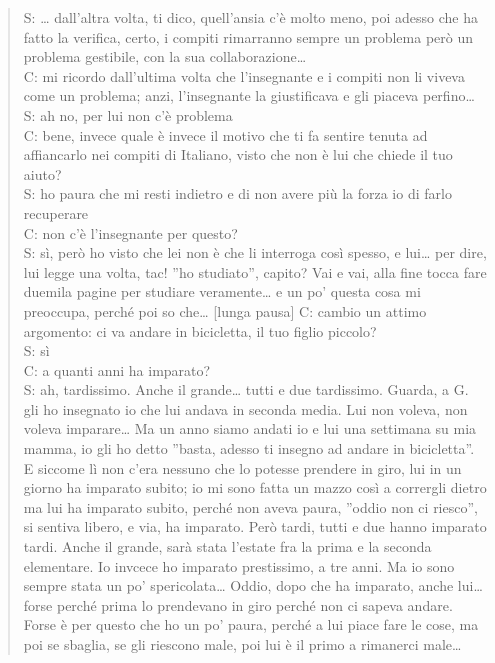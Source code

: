 \begin{verse}
S: \ldots{}   dall'altra volta, ti dico, quell'ansia c'è molto meno, poi adesso che ha fatto la verifica, certo, i compiti rimarranno sempre un problema però un problema gestibile, con la sua collaborazione\ldots{}  \\
C: mi ricordo dall'ultima volta che l'insegnante e i compiti non li viveva come un problema; anzi, l'insegnante la giustificava  e gli piaceva perfino\ldots{}  \\
S: ah no, per lui non c'è problema\\
C: bene, invece quale è invece il motivo che ti fa sentire tenuta ad affiancarlo nei compiti di Italiano, visto che non è lui che chiede il tuo aiuto?\\
S: ho paura che mi resti indietro e di non avere più la forza io di farlo recuperare\\
C: non c'è l'insegnante per questo?\\
S: sì, però ho visto che lei non è che li interroga così spesso, e lui\ldots{}   per dire, lui legge una volta, tac! ''ho studiato'', capito? Vai e vai, alla fine tocca fare duemila pagine per studiare veramente\ldots{}   e  un po' questa cosa mi preoccupa, perché poi so che\ldots{}   [lunga pausa]
C: cambio un attimo argomento: ci va andare in bicicletta, il tuo figlio piccolo?\\
S: sì\\
C: a quanti anni ha imparato?\\
S: ah, tardissimo. Anche il grande\ldots{}   tutti e due tardissimo. Guarda, a G. gli ho insegnato io che lui andava in seconda media. Lui non voleva, non voleva imparare\ldots{}   Ma un anno siamo andati io e lui una settimana su mia mamma, io gli ho detto ''basta, adesso ti insegno ad andare in bicicletta''. E siccome lì non c'era nessuno che lo potesse prendere in giro, lui in un giorno ha imparato subito; io mi sono fatta un mazzo così a corrergli dietro ma lui ha imparato subito, perché non aveva paura, ''oddio non ci riesco'', si sentiva libero, e via, ha imparato. Però tardi, tutti e due hanno imparato tardi. Anche il grande, sarà stata l'estate fra la prima e la seconda elementare. Io invcece ho imparato prestissimo, a tre anni. Ma io sono sempre stata un po' spericolata\ldots{}   Oddio, dopo che ha imparato, anche lui\ldots{}   forse perché prima lo prendevano in giro perché non ci sapeva andare. Forse è per questo che ho un po' paura, perché a lui piace fare le cose, ma poi se sbaglia, se gli riescono male, poi lui è il primo a rimanerci male\ldots{}  \\

\end{verse}
